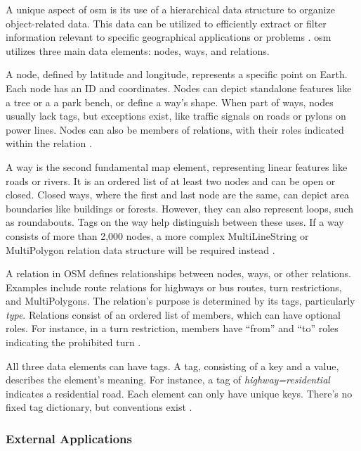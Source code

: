 A unique aspect of \gls{osm} is its use of a hierarchical data structure to organize object-related data. This data can be utilized to efficiently extract or filter information relevant to specific geographical applications or problems \autocite{Schott.Zell.ea2024}. \gls{osm} utilizes three main data elements: nodes, ways, and relations.

A node, defined by latitude and longitude, represents a specific point on Earth. Each node has an ID and coordinates. Nodes can depict standalone features like a tree or a a park bench, or define a way's shape. When part of ways, nodes usually lack tags, but exceptions exist, like traffic signals on roads or pylons on power lines. Nodes can also be members of relations, with their roles indicated within the relation \autocite{Minghini.Frassinelli2019,OSMWiki2024}.

A way is the second fundamental map element, representing linear features like roads or rivers. It is an ordered list of at least two nodes and can be open or closed. Closed ways, where the first and last node are the same, can depict area boundaries like buildings or forests. However, they can also represent loops, such as roundabouts. Tags on the way help distinguish between these uses. If a way consists of more than 2,000 nodes, a more complex MultiLineString or MultiPolygon relation data structure will be required instead \autocite{Minghini.Frassinelli2019,OSMWiki2024}.

A relation in OSM defines relationships between nodes, ways, or other relations. Examples include route relations for highways or bus routes, turn restrictions, and MultiPolygons. The relation's purpose is determined by its tags, particularly \emph{type}. Relations consist of an ordered list of members, which can have optional roles. For instance, in a turn restriction, members have \enquote{from} and \enquote{to} roles indicating the prohibited turn \autocite{Minghini.Frassinelli2019,OSMWiki2024}.

All three data elements can have tags. A tag, consisting of a key and a value, describes the element's meaning. For instance, a tag of \emph{highway=residential} indicates a residential road. Each element can only have unique keys. There's no fixed tag dictionary, but conventions exist \autocite{Ludwig.Hecht.ea2021,Mocnik.Zipf.ea2017}.

\subsubsection*{External Applications}

